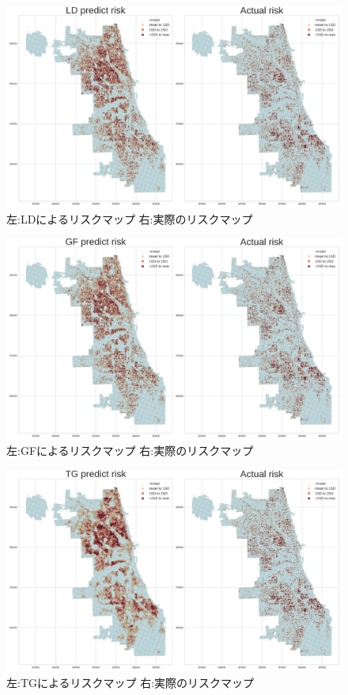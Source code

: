\begin{figure}
  \centering %
  \includegraphics[scale=0.25]{./non-crime-no-timeseries-fig/LD_riskmap.png}
  \caption{左:LDによるリスクマップ 右:実際のリスクマップ}
  \label{fig:non-crime-no-timeseries-ld-risk}
\end{figure}

\begin{figure}
  \centering %
  \includegraphics[scale=0.25]{./non-crime-no-timeseries-fig/GF_riskmap.png}
  \caption{左:GFによるリスクマップ 右:実際のリスクマップ}
  \label{fig:non-crime-no-timeseries-gf-risk}
\end{figure}

\begin{figure}
  \centering %
  \includegraphics[scale=0.25]{./non-crime-no-timeseries-fig/TG_riskmap.png}
  \caption{左:TGによるリスクマップ 右:実際のリスクマップ}
  \label{fig:non-crime-no-timeseries-tg-risk}
\end{figure}

